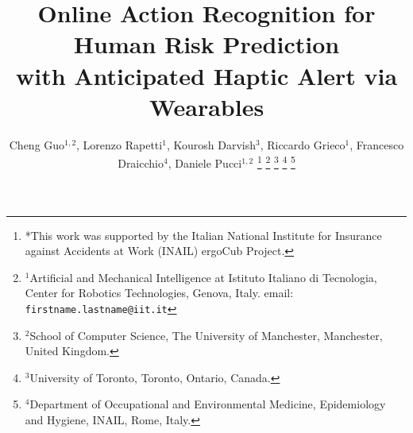 \documentclass[letterpaper, 10 pt, conference]{ieeeconf}  %
\title{\LARGE \bf
Online Action Recognition for Human Risk Prediction \\ with Anticipated Haptic Alert via Wearables
}
\author{Cheng Guo$^{1,2}$, Lorenzo Rapetti$^{1}$, Kourosh Darvish$^{3}$, Riccardo Grieco$^{1}$, Francesco Draicchio$^{4}$, Daniele Pucci$^{1,2}$%
\thanks{*This work was supported by the Italian National Institute for Insurance against Accidents at Work (INAIL) ergoCub Project.}%
\thanks{$^{1}$Artificial and Mechanical Intelligence at Istituto Italiano di Tecnologia, Center for Robotics Technologies, Genova, Italy. 
        email: {\tt\small { firstname.lastname@iit.it}}}%
\thanks{$^{2}$School of Computer Science, The University of Manchester, Manchester, United Kingdom.}%
\thanks{$^{3}$University of Toronto, Toronto, Ontario, Canada.}%
\thanks{$^{4}$Department of Occupational and Environmental Medicine, Epidemiology and Hygiene, INAIL, Rome, Italy.}%
}
\begin{document}
\maketitle
\thispagestyle{empty}
\pagestyle{empty}

\begin{abstract}



\end{abstract}
















\end{document}
